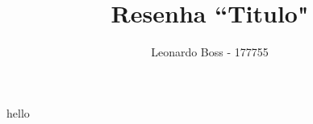 \documentclass{article}
\title{Resenha ``Titulo"}
\author{Leonardo Boss - 177755}
\begin{document}
\maketitle

hello

\parencite{test}

\printbibliography
\end{document}
